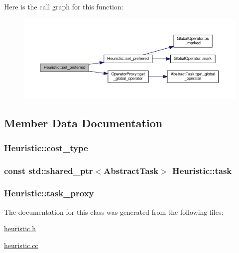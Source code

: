Here is the call graph for this function\-:
\nopagebreak
\begin{figure}[H]
\begin{center}
\leavevmode
\includegraphics[width=350pt]{classHeuristic_a5edad9b47f651f5fb5f5ca0155598bf4_cgraph}
\end{center}
\end{figure}




\subsection{Member Data Documentation}
\hypertarget{classHeuristic_a03d136586bf5c7c9f501d0ee3c2f477f}{
\subsubsection[{cost\-\_\-type}]{ Heuristic\-::cost\-\_\-type\hspace{0.3cm}{\ttfamily [protected]}}}\label{classHeuristic_a03d136586bf5c7c9f501d0ee3c2f477f}
\hypertarget{classHeuristic_a18d1566ceffd9eda72872097aa69b8ee}{
\subsubsection[{task}]{\setlength{\rightskip}{0pt plus 5cm}const std\-::shared\-\_\-ptr$<${\bf Abstract\-Task}$>$ Heuristic\-::task\hspace{0.3cm}{\ttfamily [protected]}}}\label{classHeuristic_a18d1566ceffd9eda72872097aa69b8ee}
\hypertarget{classHeuristic_a6d5e017aecf4112988ed9073d153af20}{
\subsubsection[{task\-\_\-proxy}]{ Heuristic\-::task\-\_\-proxy\hspace{0.3cm}{\ttfamily [protected]}}}\label{classHeuristic_a6d5e017aecf4112988ed9073d153af20}


The documentation for this class was generated from the following files\-:\begin{DoxyCompactItemize}
\item 
\hyperlink{heuristic_8h}{heuristic.\-h}\item 
\hyperlink{heuristic_8cc}{heuristic.\-cc}\end{DoxyCompactItemize}
